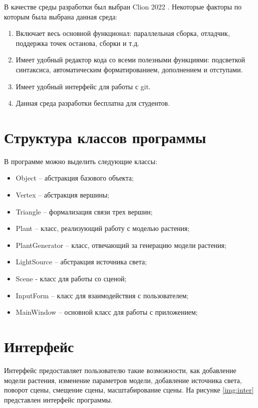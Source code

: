 В качестве среды разработки был выбран Clion 2022 \cite{about_clion}. Некоторые факторы по которым была выбрана данная среда:
\begin{enumerate}
	\item Включает весь основной функционал: параллельная сборка, отладчик, поддержка точек останова, сборки и т.д.
	\item Имеет удобный редактор кода со всеми полезными функциями: подсветкой синтаксиса, автоматическим форматированием, дополнением и отступами.
	\item Имеет удобный интерфейс для работы с git.
        \item Данная среда разработки бесплатна для студентов.
\end{enumerate}

\newpage

\section{Структура классов программы}
В программе можно выделить следующие классы:

\begin{itemize}
    \item Object – абстракция базового объекта;
    \item Vertex – абстракция вершины;
    \item Triangle – формализация связи трех вершин;
    \item Plant – класс, реализующий работу с моделью растения;
    \item PlantGenerator – класс, отвечающий за генерацию модели растения;
    \item LightSource – абстракция источника света;
    \item Scene - класс для работы со сценой;
    \item InputForm – класс для взаимодействия с пользователем;
    \item MainWindow – основной класс для работы с приложением;
\end{itemize}
  

\clearpage

\section{Интерфейс}
Интерфейс предоставляет пользователю такие возможности, как добавление модели растения, изменение параметров модели, добавление источника света, поворот сцены, смещение сцены, масштабирование сцены.
На рисунке \ref{img:inter} представлен интерфейс программы.


